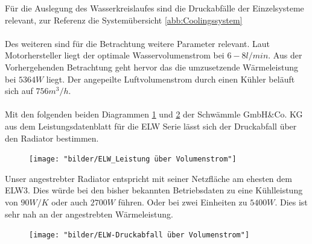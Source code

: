 Für die Auslegung des Wasserkreislaufes sind die Druckabfälle der Einzelsysteme relevant, zur Referenz die Systemübersicht \ref{abb:Coolingssystem}\\
\\
Des weiteren sind für die Betrachtung weitere Parameter relevant. Laut Motorhersteller liegt der optimale Wasservolumenstrom bei  \ensuremath{6-8l/min}. Aus der Vorhergehenden Betrachtung geht hervor das die umzusetzende Wärmeleistung bei \ensuremath{5364 W} liegt. Der angepeilte Luftvolumenstrom durch einen Kühler beläuft sich auf \ensuremath{756 m^3/h}.\\
\\
Mit den folgenden beiden Diagrammen \ref{fig:elwleistung-uber-volumenstrom} und \ref{fig:elw-druckabfall-uber-volumenstrom} der Schwämmle GmbH\&Co. KG aus dem Leistungsdatenblatt für die ELW Serie lässt sich der Druckabfall über den Radiator bestimmen.

\begin{figure}[h]
	\centering
	\texttt{[image: "bilder/ELW\_Leistung über Volumenstrom"]}
	\caption{}
	\label{fig:elwleistung-uber-volumenstrom}
\end{figure}

Unser angestrebter Radiator entspricht mit seiner Netzfläche am ehesten dem ELW3. Dies würde bei den bisher bekannten Betriebsdaten zu eine Kühlleistung von \ensuremath{90 W/K} oder auch \ensuremath{2700 W} führen. Oder bei zwei Einheiten zu \ensuremath{5400 W}. Dies ist sehr nah an der angestrebten Wärmeleistung.

\begin{figure}[h]
	\centering
	\texttt{[image: "bilder/ELW-Druckabfall über Volumenstrom"]}
	\caption{}
	\label{fig:elw-druckabfall-uber-volumenstrom}
\end{figure}

